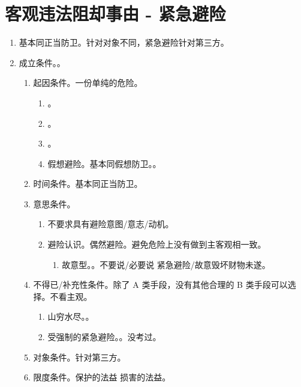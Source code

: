 \section{客观违法阻却事由 - 紧急避险}
\begin{enumerate}
  \item 基本同正当防卫。针对对象不同，紧急避险针对第三方。
  \item 成立条件。。
        \begin{enumerate}
          \item 起因条件。一份单纯的危险。
                \begin{enumerate}
                  \item {}。
                  \item {}。
                  \item {}。
                  \item 假想避险。基本同假想防卫。。
                \end{enumerate}
          \item 时间条件。基本同正当防卫。
          \item 意思条件。
                \begin{enumerate}
                  \item 不要求具有避险意图/意志/动机。
                  \item 避险认识。偶然避险。避免危险上没有做到主客观相一致。
                        \begin{enumerate}
                          \item 故意型。。不要说/必要说 \yjt 紧急避险/故意毁坏财物未遂。
                        \end{enumerate}
                \end{enumerate}
          \item 不得已/补充性条件。除了 A 类手段，没有其他合理的 B 类手段可以选择。不看主观。
                \begin{enumerate}
                  \item 山穷水尽。。
                  \item 受强制的紧急避险。。没考过。
                \end{enumerate}
          \item 对象条件。针对第三方。
          \item 限度条件。保护的法益 \dydy 损害的法益。
        \end{enumerate}
\end{enumerate}
